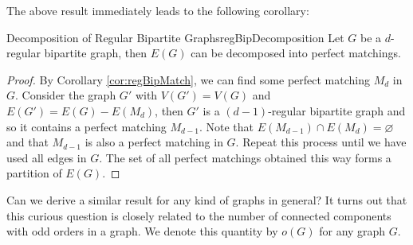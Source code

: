 \documentclass[math, code]{amznotes}
\theoremstyle{remark}
\begin{document}
The above result immediately leads to the following corollary:
\begin{corbox}{Decomposition of Regular Bipartite Graphs}{regBipDecomposition}
    Let $G$ be a $d$-regular bipartite graph, then $E(G)$ can be decomposed into perfect matchings.
    \tcblower
    \begin{proof}
        By Corollary \ref{cor:regBipMatch}, we can find some perfect matching $M_d$ in $G$. Consider the graph $G'$ with $V(G') = V(G)$ and $E(G') = E(G) - E(M_d)$, then $G'$ is a $(d - 1)$-regular bipartite graph and so it contains a perfect matching $M_{d - 1}$. Note that $E(M_{d - 1}) \cap E(M_d) = \varnothing$ and that $M_{d - 1}$ is also a perfect matching in $G$. Repeat this process until we have used all edges in $G$. The set of all perfect matchings obtained this way forms a partition of $E(G)$.
    \end{proof}
\end{corbox}
Can we derive a similar result for any kind of graphs in general? It turns out that this curious question is closely related to the number of connected components with odd orders in a graph. We denote this quantity by $o(G)$ for any graph $G$.
\end{document}
